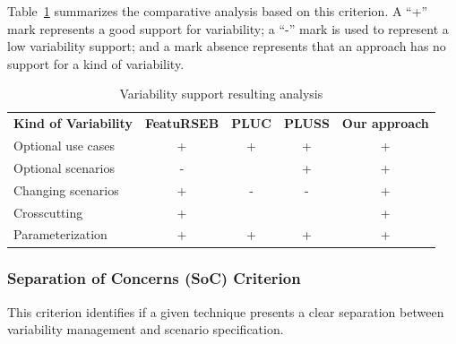 \documentclass{llncs}
\begin{document}
Table~\ref{tab:crt-01} summarizes the comparative analysis based on
this criterion. A ``+'' mark represents a good support for
variability; a ``-'' mark is used to represent a low variability
support; and a mark absence represents that an approach has no
support for a kind of variability.


\begin{table}[h]
\begin{center}
\caption{Variability support resulting analysis} \label{tab:crt-01}
\begin{tabular}{lcccc}
   \hline\noalign{\smallskip}
  {\bf Kind of Variability} & {\bf FeatuRSEB} & {\bf PLUC} & {\bf PLUSS} & {\bf Our approach} \\
   \noalign{\smallskip}
   \hline
   \noalign{\smallskip}
    Optional use cases    & +     & +     & +     & + \\ 
    Optional scenarios    & -     &       & +     & + \\ 
    Changing scenarios    & +     & -     & -     & + \\ 
    Crosscutting          & +     &       &       & + \\ 
    Parameterization      & +     & +     & +     & + \\ \hline
\end{tabular}
\end{center}
\end{table}




\subsubsection{Separation of Concerns (SoC) Criterion}
This criterion identifies if a given technique presents a clear
separation between variability management and scenario 
specification.
\end{document}
